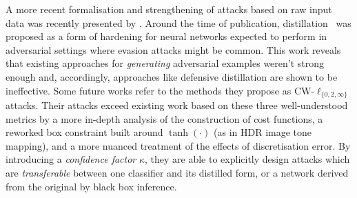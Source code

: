 A more recent formalisation and strengthening of attacks based on raw input data was recently presented by \textcite{DBLP:conf/sp/Carlini017}.
Around the time of publication, distillation~\parencite{DBLP:conf/sp/PapernotM0JS16} was proposed as a form of hardening for neural networks expected to perform in adversarial settings where evasion attacks might be common.
This work reveals that existing approaches for \emph{generating} adversarial examples weren't strong enough and, accordingly, approaches like defensive distillation are shown to be ineffective.
Some future works refer to the methods they propose as CW-$\ell_{\{0, 2, \infty\}}$ attacks.
Their attacks exceed existing work based on these three well-understood metrics by a more in-depth analysis of the construction of cost functions, a reworked box constraint built around $\tanh(\cdot)$ (as in HDR image tone mapping), and a more nuanced treatment of the effects of discretisation error.
By introducing a \emph{confidence factor} $\kappa$, they are able to explicitly design attacks which are \emph{transferable} between one classifier and its distilled form, or a network derived from the original by black box inference.




